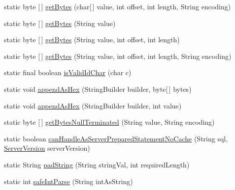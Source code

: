\begin{DoxyCompactItemize}
\item 
static byte \mbox{[}$\,$\mbox{]} \mbox{\hyperlink{classcom_1_1mysql_1_1cj_1_1util_1_1_string_utils_a422b1cae6a464bf3f1e7047bdf4ad2e5}{get\+Bytes}} (char\mbox{[}$\,$\mbox{]} value, int offset, int length, String encoding)
\item 
static byte \mbox{[}$\,$\mbox{]} \mbox{\hyperlink{classcom_1_1mysql_1_1cj_1_1util_1_1_string_utils_a2604a7b8b0c172222607ae600fa01701}{get\+Bytes}} (String value)
\item 
static byte \mbox{[}$\,$\mbox{]} \mbox{\hyperlink{classcom_1_1mysql_1_1cj_1_1util_1_1_string_utils_ac410c21fd9bb1b197c87dae236a62d68}{get\+Bytes}} (String value, int offset, int length)
\item 
static byte \mbox{[}$\,$\mbox{]} \mbox{\hyperlink{classcom_1_1mysql_1_1cj_1_1util_1_1_string_utils_a320c6cc47f6666d72e62e9e165d9e1f1}{get\+Bytes}} (String value, int offset, int length, String encoding)
\item 
static final boolean \mbox{\hyperlink{classcom_1_1mysql_1_1cj_1_1util_1_1_string_utils_ae5fe73848dc0997926faf1a422b7439f}{is\+Valid\+Id\+Char}} (char c)
\item 
static void \mbox{\hyperlink{classcom_1_1mysql_1_1cj_1_1util_1_1_string_utils_a3af23eb4bbd83ea2b0d535afb119d34e}{append\+As\+Hex}} (String\+Builder builder, byte\mbox{[}$\,$\mbox{]} bytes)
\item 
static void \mbox{\hyperlink{classcom_1_1mysql_1_1cj_1_1util_1_1_string_utils_a39741a5f2e8f10ee2aedf405eaa8da55}{append\+As\+Hex}} (String\+Builder builder, int value)
\item 
static byte \mbox{[}$\,$\mbox{]} \mbox{\hyperlink{classcom_1_1mysql_1_1cj_1_1util_1_1_string_utils_a8b6ffc159e4cf0b6796526a963cdbe59}{get\+Bytes\+Null\+Terminated}} (String value, String encoding)
\item 
static boolean \mbox{\hyperlink{classcom_1_1mysql_1_1cj_1_1util_1_1_string_utils_a434e3b5a96c5c5c7b3b001766ecc44d5}{can\+Handle\+As\+Server\+Prepared\+Statement\+No\+Cache}} (String sql, \mbox{\hyperlink{classcom_1_1mysql_1_1cj_1_1_server_version}{Server\+Version}} server\+Version)
\item 
static String \mbox{\hyperlink{classcom_1_1mysql_1_1cj_1_1util_1_1_string_utils_a43143dc6d2b0e3a46dc0c715d97f78ac}{pad\+String}} (String string\+Val, int required\+Length)
\item 
static int \mbox{\hyperlink{classcom_1_1mysql_1_1cj_1_1util_1_1_string_utils_a424742b9ab9d0cf8e84eea0f13034f80}{safe\+Int\+Parse}} (String int\+As\+String)

\end{DoxyCompactItemize}

